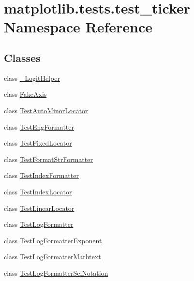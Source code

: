 \hypertarget{namespacematplotlib_1_1tests_1_1test__ticker}{}\section{matplotlib.\+tests.\+test\+\_\+ticker Namespace Reference}
\label{namespacematplotlib_1_1tests_1_1test__ticker}
\subsection*{Classes}
\begin{DoxyCompactItemize}
\item 
class \hyperlink{classmatplotlib_1_1tests_1_1test__ticker_1_1__LogitHelper}{\+\_\+\+Logit\+Helper}
\item 
class \hyperlink{classmatplotlib_1_1tests_1_1test__ticker_1_1FakeAxis}{Fake\+Axis}
\item 
class \hyperlink{classmatplotlib_1_1tests_1_1test__ticker_1_1TestAutoMinorLocator}{Test\+Auto\+Minor\+Locator}
\item 
class \hyperlink{classmatplotlib_1_1tests_1_1test__ticker_1_1TestEngFormatter}{Test\+Eng\+Formatter}
\item 
class \hyperlink{classmatplotlib_1_1tests_1_1test__ticker_1_1TestFixedLocator}{Test\+Fixed\+Locator}
\item 
class \hyperlink{classmatplotlib_1_1tests_1_1test__ticker_1_1TestFormatStrFormatter}{Test\+Format\+Str\+Formatter}
\item 
class \hyperlink{classmatplotlib_1_1tests_1_1test__ticker_1_1TestIndexFormatter}{Test\+Index\+Formatter}
\item 
class \hyperlink{classmatplotlib_1_1tests_1_1test__ticker_1_1TestIndexLocator}{Test\+Index\+Locator}
\item 
class \hyperlink{classmatplotlib_1_1tests_1_1test__ticker_1_1TestLinearLocator}{Test\+Linear\+Locator}
\item 
class \hyperlink{classmatplotlib_1_1tests_1_1test__ticker_1_1TestLogFormatter}{Test\+Log\+Formatter}
\item 
class \hyperlink{classmatplotlib_1_1tests_1_1test__ticker_1_1TestLogFormatterExponent}{Test\+Log\+Formatter\+Exponent}
\item 
class \hyperlink{classmatplotlib_1_1tests_1_1test__ticker_1_1TestLogFormatterMathtext}{Test\+Log\+Formatter\+Mathtext}
\item 
class \hyperlink{classmatplotlib_1_1tests_1_1test__ticker_1_1TestLogFormatterSciNotation}{Test\+Log\+Formatter\+Sci\+Notation}

\end{DoxyCompactItemize}
